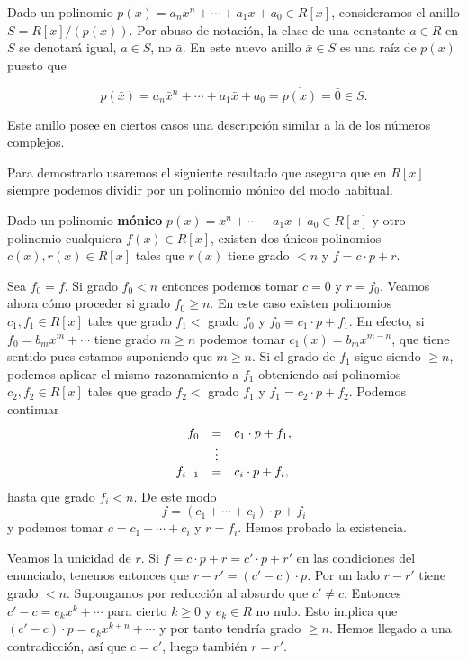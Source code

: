 Dado un polinomio \(p(x)=a_nx^n+\cdots + a_1x+ a_0\in R[x]\),
consideramos el anillo \(S=R[x]/(p(x))\). Por abuso de notación, la
clase de una constante \(a\in R\) en \(S\) se denotará igual,
\(a\in S\), no \(\bar a\). En este nuevo anillo \(\bar x\in S\) es una
raíz de \(p(x)\) puesto que

\[ p(\bar{x})=a_n\bar x^n+\cdots + a_1 \bar x+ a_0=\overline{p(x)}=\bar 0\in S.\]

Este anillo posee en ciertos casos una descripción similar a la de los
números complejos.

Para demostrarlo usaremos el siguiente resultado que asegura que en
\(R[x]\) siempre podemos dividir por un polinomio mónico del modo
habitual.


Dado un polinomio \textbf{mónico}
\(p(x)=x^n+\cdots + a_1x+ a_0\in R[x]\) y otro polinomio cualquiera
\(f(x)\in R[x]\), existen dos únicos polinomios\\
\(c(x), r(x)\in R[x]\) tales que \(r(x)\) tiene grado \(<n\) y
\(f=c\cdot p+r\). 


Sea \(f_0=f\). Si grado \(f_0<n\) entonces podemos tomar \(c=0\) y
\(r=f_0\). Veamos ahora cómo proceder si grado \(f_0\geq n\). En este
caso existen polinomios \(c_1,f_1\in R[x]\) tales que grado \(f_1<\)
grado \(f_0\) y \(f_0=c_1\cdot p + f_1\). En efecto, si
\(f_0=b_mx^m+\cdots\) tiene grado \(m\geq n\) podemos tomar
\(c_1(x)=b_mx^{m-n}\), que tiene sentido pues estamos suponiendo que
\(m\geq n\). Si el grado de \(f_1\) sigue siendo \(\geq n\), podemos
aplicar el mismo razonamiento a \(f_1\) obteniendo así polinomios
\(c_2,f_2\in R[x]\) tales que grado \(f_2<\) grado \(f_1\) y
\(f_1=c_2\cdot p + f_2\). Podemos continuar \[
\begin{array}{rcl}
f_0&=&c_1\cdot p + f_1,\cr
&\vdots&\cr
f_{i-1}&=&c_i\cdot p + f_i,
\end{array}
\] hasta que grado \(f_i<n\). De este modo
\[f=(c_1+\cdots+c_i)\cdot p+f_i\] y podemos tomar
\(c=c_1+\cdots+c_i\) y \(r=f_i\). Hemos probado la existencia.

Veamos la unicidad de \(r\). Si \(f=c\cdot p+r=c'\cdot p+r'\) en las
condiciones del enunciado, tenemos entonces que \(r-r'=(c'-c)\cdot p\).
Por un lado \(r-r'\) tiene grado \(<n\). Supongamos por reducción al
absurdo que \(c'\neq c\). Entonces \(c'-c=e_kx^k+\cdots\) para cierto
\(k\geq 0\) y \(e_k\in R\) no nulo. Esto implica que
\((c'-c)\cdot p=e_kx^{k+n}+\cdots\) y por tanto tendría grado
\(\geq n\). Hemos llegado a una contradicción, así que \(c=c'\), luego
también \(r=r'\). 

